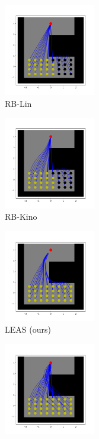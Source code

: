 \begin{figure}[h]
    \centering
    \captionsetup[subfigure]{justification=centering}
    \begin{subfigure}[t]{0.4\linewidth}
    \includegraphics[width=\textwidth, height=4cm,trim={1cm 1cm 1cm 1cm},clip]{Figures/Chapter_LEAS/hole_p1_lin.png}
    \caption{RB-Lin}
    \label{fig:leas:hole:lin}
    \end{subfigure}
    \begin{subfigure}[t]{0.4\linewidth}
    \includegraphics[width=\textwidth, height=4cm,trim={1cm 1cm 1cm 1cm},clip]{Figures/Chapter_LEAS/hole_p1_kino.png}
    \caption{RB-Kino}
    \label{fig:leas:hole:kino}
    \end{subfigure}
    \begin{subfigure}[t]{0.4\linewidth}
    \includegraphics[width=\textwidth, height=4cm,trim={1cm 1cm 1cm 1cm},clip]{Figures/Chapter_LEAS/hole_p1_leas.png}
    \caption{LEAS (ours)}
    \label{fig:leas:hole:leas}
    \end{subfigure}
    \begin{subfigure}[t]{0.4\linewidth}
    \includegraphics[width=\textwidth, height=4cm,trim={1cm 1cm 1cm 1cm},clip]{Figures/Chapter_LEAS/hole_p1_kino_rrt.png}

\end{subfigure}
\end{figure}
